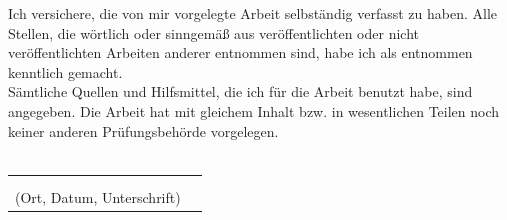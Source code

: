\documentclass[a4paper,12pt,oneside]{article}
\begin{document}
    Ich versichere, die von mir vorgelegte Arbeit selbständig verfasst zu haben.
    Alle Stellen, die wörtlich oder sinngemäß aus veröffentlichten oder nicht veröffentlichten Arbeiten anderer entnommen sind,
    habe ich als entnommen kenntlich gemacht.\\ 
    Sämtliche Quellen und Hilfsmittel, die ich für die Arbeit benutzt habe, sind
    angegeben. Die Arbeit hat mit gleichem Inhalt bzw. in wesentlichen Teilen noch keiner anderen Prüfungsbehörde vorgelegen.\\\\
    \begin{tabular}{cp{7cm}}
    & \\ 
    & \\ \hline
    \small (Ort, Datum, Unterschrift) & \normalsize \\
    \end{tabular}
    
    
    \newpage
    \thispagestyle{empty}
    
\end{document}
